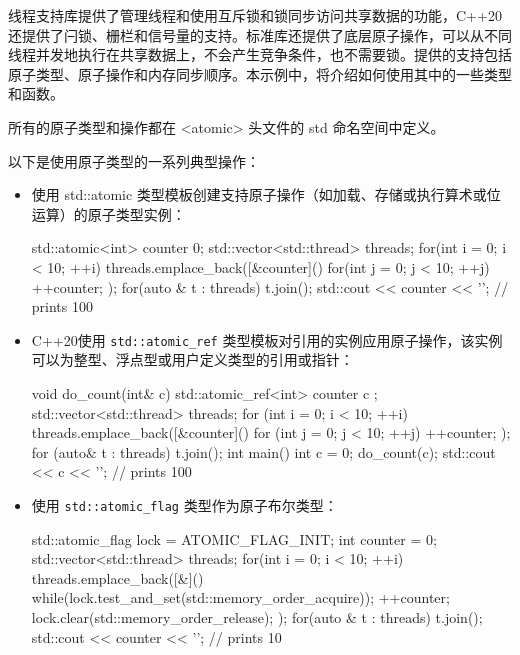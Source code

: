 线程支持库提供了管理线程和使用互斥锁和锁同步访问共享数据的功能，C++20 还提供了闩锁、栅栏和信号量的支持。标准库还提供了底层原子操作，可以从不同线程并发地执行在共享数据上，不会产生竞争条件，也不需要锁。提供的支持包括原子类型、原子操作和内存同步顺序。本示例中，将介绍如何使用其中的一些类型和函数。


所有的原子类型和操作都在 <atomic> 头文件的 std 命名空间中定义。


以下是使用原子类型的一系列典型操作：

\begin{itemize}
\item
使用 std::atomic 类型模板创建支持原子操作（如加载、存储或执行算术或位运算）的原子类型实例：

\begin{cpp}
std::atomic<int> counter {0};
std::vector<std::thread> threads;
for(int i = 0; i < 10; ++i)
{
    threads.emplace_back([&counter](){
        for(int j = 0; j < 10; ++j)
        ++counter;
    });
}
for(auto & t : threads) t.join();
std::cout << counter << '\n'; // prints 100
\end{cpp}

\item
C++20使用 \verb|std::atomic_ref| 类型模板对引用的实例应用原子操作，该实例可以为整型、浮点型或用户定义类型的引用或指针：

\begin{cpp}
void do_count(int& c)
{
    std::atomic_ref<int> counter{ c };
    std::vector<std::thread> threads;
    for (int i = 0; i < 10; ++i)
    {
        threads.emplace_back([&counter]() {
            for (int j = 0; j < 10; ++j)
                ++counter;
        });
    }
    for (auto& t : threads) t.join();
}
int main()
{
    int c = 0;
    do_count(c);
    std::cout << c << '\n'; // prints 100
}
\end{cpp}

\item
使用 \verb|std::atomic_flag| 类型作为原子布尔类型：

\begin{cpp}
std::atomic_flag lock = ATOMIC_FLAG_INIT;
int counter = 0;
std::vector<std::thread> threads;
for(int i = 0; i < 10; ++i)
{
    threads.emplace_back([&](){
        while(lock.test_and_set(std::memory_order_acquire));
            ++counter;
        lock.clear(std::memory_order_release);
    });
}
for(auto & t : threads) t.join();
std::cout << counter << '\n'; // prints 10
\end{cpp}


\end{itemize}
